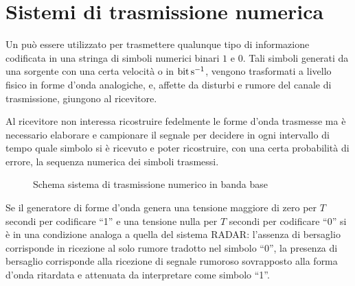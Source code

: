 \chapter{Sistemi di trasmissione numerica}
Un  può essere utilizzato per trasmettere qualunque tipo di informazione codificata in una stringa di simboli numerici binari $1$ e $0$. Tali simboli generati da una sorgente con una certa velocità o  in $\si{\bit\per\second}$, vengono trasformati a livello fisico in forme d'onda analogiche, e, affette da disturbi e rumore del canale di trasmissione, giungono al ricevitore.

Al ricevitore non interessa ricostruire fedelmente le forme d'onda trasmesse ma è necessario elaborare e campionare il segnale per decidere in ogni intervallo di tempo quale simbolo si è ricevuto e poter ricostruire, con una certa probabilità di errore, la sequenza numerica dei simboli trasmessi.

\begin{figure}[!ht]
	\centering
	\caption{Schema sistema di trasmissione numerico in banda base}
	\label{fig:schema_sistema_trasmissione_numerico_banda_base}
\end{figure}

Se il generatore di forme d'onda genera una tensione maggiore di zero per $T$ secondi per codificare “1” e una tensione nulla per $T$ secondi per codificare “0” si è in una condizione analoga a quella del sistema \ac{RADAR}: l'assenza di bersaglio corrisponde in ricezione al solo rumore tradotto nel simbolo “0”, la presenza di bersaglio corrisponde alla ricezione di segnale rumoroso sovrapposto alla forma d'onda ritardata e attenuata da interpretare come simbolo “1”.

